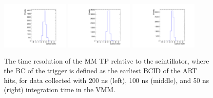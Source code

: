 \begin{figure}[!htpb]
  \begin{center}
    \includegraphics[width=0.3\textwidth]{figures/gbtanalysis3530/earliest_BCID.pdf}
    \includegraphics[width=0.3\textwidth]{figures/gbtanalysis3527/earliest_BCID.pdf}
    \includegraphics[width=0.3\textwidth]{figures/gbtanalysis3528/earliest_BCID.pdf}
  \end{center}
  \vspace{-10pt}
  \caption{The time resolution of the MM TP relative to the scintillator, where the BC of the trigger is defined as the earliest BCID of the ART hits, for data collected with 200 ns (left), 100 ns (middle), and 50 ns (right) integration time in the VMM.}
  \label{fig:integ_avg_earliest}
\end{figure}


